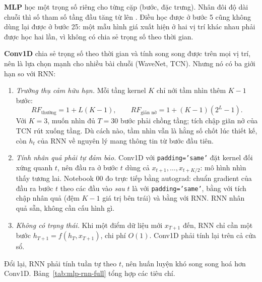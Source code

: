 \textbf{MLP} học một trọng số riêng cho từng cặp (bước, đặc trưng). Nhân đôi độ dài chuỗi thì số tham số tầng đầu tăng
từ  lên . Điều học được ở bước 5 cũng không dùng lại được ở bước 25:
một mẫu hình giá xuất hiện ở hai vị trí khác nhau phải được học hai lần, vì không có chia sẻ trọng số theo thời gian.

\textbf{Conv1D} chia sẻ trọng số theo thời gian và tính song song được trên mọi vị trí, nên là lựa chọn mạnh cho nhiều
bài chuỗi (WaveNet, TCN). Nhưng nó có ba giới hạn so với RNN:

\begin{enumerate}
  \item \emph{Trường thụ cảm hữu hạn.} Mỗi tầng kernel $K$ chỉ nới tầm nhìn thêm $K-1$ bước:
        \begin{equation}
          RF_{\text{thường}} = 1 + L(K-1), \qquad RF_{\text{giãn nở}} = 1 + (K-1)(2^L - 1).
          \label{eq:rf}
        \end{equation}
        Với $K = 3$, muốn nhìn đủ $T = 30$ bước phải chồng  tầng; tích chập giãn nở của TCN
        rút xuống  tầng. Dù cách nào, tầm nhìn vẫn là hằng số chốt lúc thiết kế,
        còn $h_t$ của RNN về nguyên lý mang thông tin từ bước đầu tiên.
  \item \emph{Tính nhân quả phải tự đảm bảo.} Conv1D với \texttt{padding='same'} đặt kernel đối xứng quanh $t$, nên
        đầu ra ở bước $t$ dùng cả $x_{t+1}, \dots, x_{t+K/2}$: mô hình nhìn thấy tương lai. Notebook 00 đo trực tiếp
        bằng autograd: chuẩn gradient của đầu ra bước $t$ theo các đầu vào \emph{sau} $t$ là 
        với \texttt{padding='same'}, bằng  với tích chập nhân quả (đệm $K-1$ giá trị bên trái)
        và bằng  với RNN. RNN nhân quả sẵn, không cần cấu hình gì.
  \item \emph{Không có trạng thái.} Khi một điểm dữ liệu mới $x_{T+1}$ đến, RNN chỉ cần một bước
        $h_{T+1} = f(h_T, x_{T+1})$, chi phí $O(1)$. Conv1D phải tính lại trên cả cửa sổ.
\end{enumerate}


Đổi lại, RNN phải tính tuần tự theo $t$, nên huấn luyện khó song song hoá hơn Conv1D. Bảng~\ref{tab:mlp-rnn-full} tổng
hợp các tiêu chí.

